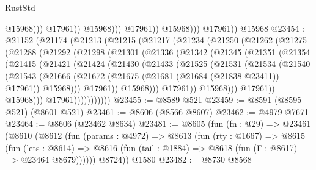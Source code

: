 \begin{lexlean}{RustStd}
\begin{coremodule}
                                  @15968)))
                            @17961))
                        @15968)))
                  @17961))
              @15968)))
        @17961))
    @15968
@23454 := @21152
    (@21174
      (@21213
        (@21215
          (@21217
            (@21234
              (@21250
                (@21262
                  (@21275
                    (@21288
                      (@21292
                        (@21298
                          (@21301
                            (@21336
                              (@21342
                                (@21345
                                  (@21351
                                    (@21354
                                      (@21415
                                        (@21421
                                          (@21424
                                            (@21430
                                              (@21433
                                                (@21525
                                                  (@21531
                                                    (@21534
                                                      (@21540
                                                        (@21543
                                                          (@21666
                                                            (@21672
                                                              (@21675
                                                                (@21681
                                                                  (@21684 (@21838 @23411))
                                                                  @17961))
                                                              @15968)))
                                                        @17961))
                                                    @15968)))
                                              @17961))
                                          @15968)))
                                    @17961))
                                @15968)))
                          @17961)))))))))))
@23455 := @8589 @521
@23459 := @8591 (@8595 @521) (@8601 @521)
@23461 := @8606 (@8566 @8607)
@23462 := @4979 @7671
@23464 := @8606 (@23462 @8634)
@23481 := @8605
    (fun (fn : @29) =>
    @23461
      (@8610
        (@8612
          (fun (params : @4972) =>
          @8613
            (fun (rty : @1667) =>
            @8615
              (fun (lets : @8614) =>
              @8616 (fun (tail : @1884) => @8618 (fun (Γ : @8617) => @23464 @8679))))))
        @8724))
    @1580
@23482 := @8730 @8568

\end{coremodule}
\end{lexlean}

